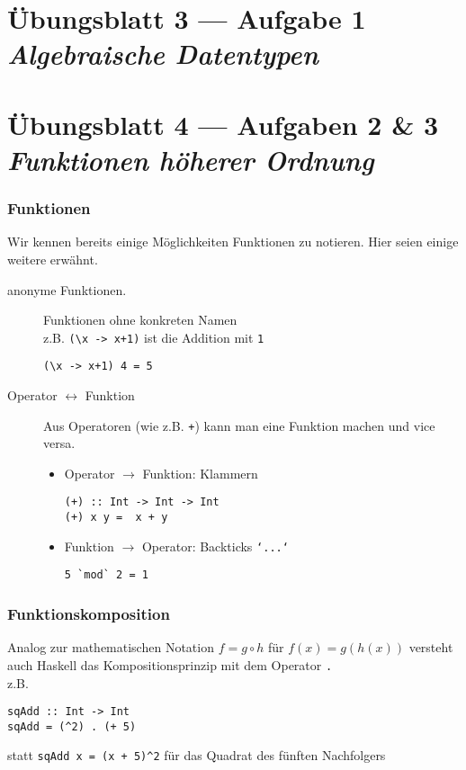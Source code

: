 \documentclass{beamer}
\begin{document}
\section{Übungsblatt 3 --- Aufgabe 1 \\ \textit{\normalsize Algebraische Datentypen}}


\section{Übungsblatt 4 --- Aufgaben 2 \& 3 \\ \textit{\normalsize Funktionen höherer Ordnung}}


\begin{frame}[fragile] \frametitle{Funktionen}
	\footnotesize
	Wir kennen bereits einige Möglichkeiten Funktionen zu notieren. Hier seien einige weitere erwähnt.
	\begin{description}
		\item[anonyme Funktionen.] Funktionen ohne konkreten Namen \\
		z.B. \lstinline[basicstyle=\ttfamily\normalsize]|(\x -> x+1)| ist die Addition mit \texttt{1} 
		\begin{lstlisting}[style=bg]
(\x -> x+1) 4 = 5
		\end{lstlisting}
		\pause
		\item[Operator $\leftrightarrow$ Funktion] Aus Operatoren (wie z.B. \texttt{+}) kann man eine Funktion machen und vice versa.
		\begin{itemize}
			\item Operator $\to$ Funktion: Klammern
			\begin{lstlisting}[style=bg]
(+) :: Int -> Int -> Int
(+) x y =  x + y
			\end{lstlisting}
			\item Funktion $\to$ Operator: Backticks \texttt{`...`}
			\begin{lstlisting}[style=bg]
5 `mod` 2 = 1
			\end{lstlisting}
		\end{itemize}
	\end{description}
\end{frame}

\begin{frame}[fragile] \frametitle{Funktionskomposition}
	Analog zur mathematischen Notation $f = g \circ h$ für $f(x) = g(h(x))$ versteht auch Haskell das Kompositionsprinzip mit dem Operator \texttt{.} \\
	z.B. 
	\begin{lstlisting}[style=bg]
sqAdd :: Int -> Int
sqAdd = (^2) . (+ 5)
	\end{lstlisting} 
	statt \lstinline[basicstyle=\ttfamily\normalsize]|sqAdd x = (x + 5)^2| für das Quadrat des fünften Nachfolgers
\end{frame}
\end{document}
